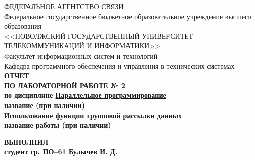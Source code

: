 \begin{titlepage}
	\begin{spacing}{1.1}
		\begin{center}		
			ФЕДЕРАЛЬНОЕ АГЕНТСТВО СВЯЗИ 
			\\
			Федеральное государственное бюджетное образовательное учреждение высшего образования
			\\
			<<ПОВОЛЖСКИЙ ГОСУДАРСТВЕННЫЙ УНИВЕРСИТЕТ ТЕЛЕКОММУНИКАЦИЙ И ИНФОРМАТИКИ>>
			\\			
			\vspace{1em}
			Факультет информационных систем и технологий
			\\
			Кафедра программного обеспечения и управления в технических системах
			\\
			\vspace{7em}
			\bfseries\Large
			ОТЧЕТ
			\\
			ПО ЛАБОРАТОРНОЙ РАБОТЕ № \underline{\hspace{0.4em}2\hspace{0.4em}}
			\\
			\vspace{0.5em}
			\normalfont
			\normalsize
			по дисциплине
			\underline{\hspace{4em}Параллельное программирование\hspace{4em}}
			\\
			\small
			\hspace{4em} название (при наличии)
			\normalsize
			\\
			\hspace{3em}			
			\underline{\hspace{2em}Использование функции групповой рассылки данных\hspace{2em}}
			\\
			\small
			\hspace{4em} название работы (при наличии)
			\normalsize
			\\		
	\end{center}			
			\vspace{5em}
			\begin{minipage}{0.5\textwidth}
				\begin{flushleft}					
				\end{flushleft}
			\end{minipage}
			\begin{minipage}{0.5\textwidth}
				\begin{center}
					\bfseries
					ВЫПОЛНИЛ
					\\
					\normalfont
					студент \hspace{1ex} \underline{гр. ПО--61} \hspace{1ex} \underline{Булычев И. Д.}

\end{center}
\end{minipage}
\end{spacing}
\end{titlepage}
